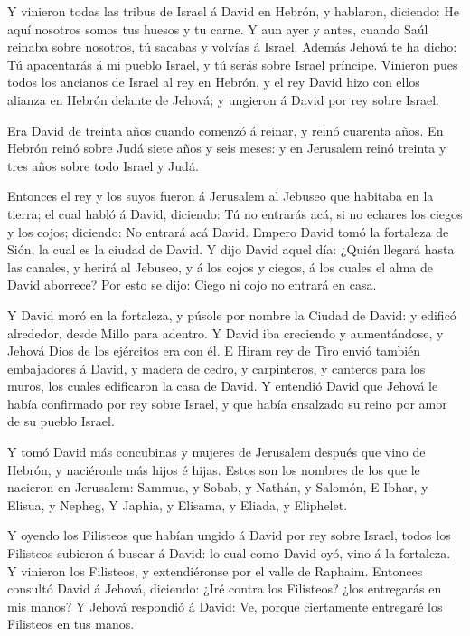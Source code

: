  Y vinieron todas las tribus de Israel á David en Hebrón, y
hablaron, diciendo: He aquí nosotros somos tus huesos y tu carne.
 Y aun ayer y antes, cuando Saúl reinaba sobre nosotros, tú
sacabas y volvías á Israel. Además Jehová te ha dicho: Tú apacentarás á
mi pueblo Israel, y tú serás sobre Israel príncipe. 
Vinieron pues todos los ancianos de Israel al rey en Hebrón, y el rey
David hizo con ellos alianza en Hebrón delante de Jehová; y ungieron á
David por rey sobre Israel.

 Era David de treinta años cuando comenzó á reinar, y reinó
cuarenta años.  En Hebrón reinó sobre Judá siete años y seis
meses: y en Jerusalem reinó treinta y tres años sobre todo Israel y
Judá.

 Entonces el rey y los suyos fueron á Jerusalem al Jebuseo
que habitaba en la tierra; el cual habló á David, diciendo: Tú no
entrarás acá, si no echares los ciegos y los cojos; diciendo: No entrará
acá David.  Empero David tomó la fortaleza de Sión, la cual
es la ciudad de David.  Y dijo David aquel día: ¿Quién
llegará hasta las canales, y herirá al Jebuseo, y á los cojos y ciegos,
á los cuales el alma de David aborrece? Por esto se dijo: Ciego ni cojo
no entrará en casa.

 Y David moró en la fortaleza, y púsole por nombre la Ciudad
de David: y edificó alrededor, desde Millo para adentro.  Y
David iba creciendo y aumentándose, y Jehová Dios de los ejércitos era
con él.  E Hiram rey de Tiro envió también embajadores á
David, y madera de cedro, y carpinteros, y canteros para los muros, los
cuales edificaron la casa de David.  Y entendió David que
Jehová le había confirmado por rey sobre Israel, y que había ensalzado
su reino por amor de su pueblo Israel.

 Y tomó David más concubinas y mujeres de Jerusalem después
que vino de Hebrón, y naciéronle más hijos é hijas.  Estos
son los nombres de los que le nacieron en Jerusalem: Sammua, y Sobab, y
Nathán, y Salomón,  E Ibhar, y Elisua, y Nepheg,
 Y Japhia, y Elisama, y Eliada, y Eliphelet.

 Y oyendo los Filisteos que habían ungido á David por rey
sobre Israel, todos los Filisteos subieron á buscar á David: lo cual
como David oyó, vino á la fortaleza.  Y vinieron los
Filisteos, y extendiéronse por el valle de Raphaim. 
Entonces consultó David á Jehová, diciendo: ¿Iré contra los Filisteos?
¿los entregarás en mis manos? Y Jehová respondió á David: Ve, porque
ciertamente entregaré los Filisteos en tus manos.

